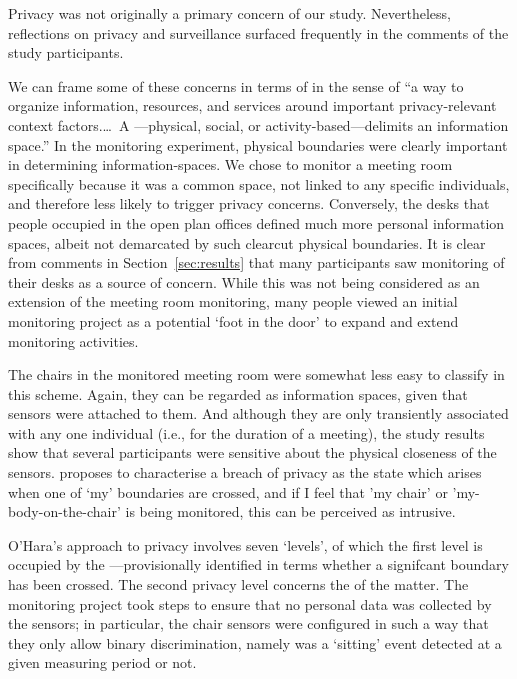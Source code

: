 
Privacy was not originally a primary concern of our study. Nevertheless,
reflections on privacy and surveillance surfaced frequently in the
comments of the study participants.

We can frame some of these concerns in terms of  \cite{Jiang-2002-MPCI} in the sense of ``a way to organize
information, resources, and services around important privacy-relevant
context factors.\ldots\ A ---physical, social, or
activity-based---delimits an information space.'' In the monitoring
experiment, physical boundaries were clearly important in determining
information-spaces. We chose to monitor a meeting room specifically
because it was a common space, not linked to any specific individuals,
and therefore less likely to trigger privacy concerns. Conversely, the
desks that people occupied in the open plan offices defined much more
personal information spaces, albeit not demarcated by such clearcut
physical boundaries. It is clear from comments in
Section~\ref{sec:results} that many participants saw monitoring of
their desks as a source of concern. While this was not being
considered as an extension of the meeting room monitoring, many people
viewed an initial monitoring project as a potential ‘foot in the door’
to expand and extend monitoring activities.

The chairs in the monitored meeting room were somewhat less easy to
classify in this scheme. Again, they can be regarded as information
spaces, given that sensors were attached to them. And although they
are only transiently associated with any one individual (i.e., for the
duration of a meeting), the study results show that several participants were
sensitive about the physical closeness of the
sensors. \cite{Ohara-2016-TSVP} proposes to characterise a breach of privacy as
the state which arises when one of `my' boundaries are crossed, and if
I feel that 'my chair' or 'my-body-on-the-chair' is being monitored,
this can be perceived as intrusive. 

O'Hara's \cite{Ohara-2016-TSVP} approach to privacy involves seven
`levels', of which the first level is occupied by the ---provisionally identified in terms whether a
signifcant boundary has been crossed. The second privacy level concerns the  of the matter. The monitoring project took steps to ensure
that no personal data was collected by the sensors; in particular, the
chair sensors were configured in such a way that they only allow binary
discrimination, namely was a `sitting' event detected at a given
measuring period or not.

